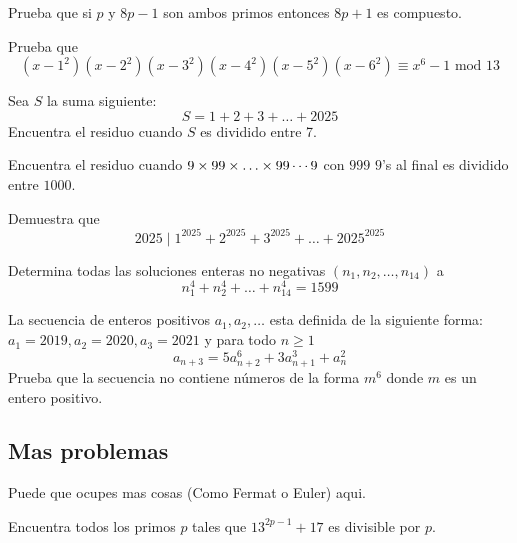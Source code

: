 \documentclass[11pt]{scrartcl}
\newcommand{\thmdifficulty}{0}
\newcommand{\problemdiff}[1]{\renewcommand{\thmdifficulty}{#1}}
\begin{document}
\problemdiff{1}
\begin{problema} 
Prueba que si $p$ y $8p-1$ son ambos primos entonces $8p+1$ es compuesto.
\end{problema}

\problemdiff{1}
 \begin{problema}
    Prueba que  
    $$(x-1^2)(x-2^2)(x-3^2)(x-4^2)(x-5^2)(x-6^2) \equiv x^6-1 \text{ mod } 13$$
\end{problema}

\problemdiff{1}
\begin{problema}
Sea $S$ la suma siguiente:
\[S=1+2+3+\ldots+2025\]
Encuentra el residuo cuando $S$ es dividido entre 7.
\end{problema}



\problemdiff{1}
\begin{problema}[AIME 2010/1]
Encuentra el residuo cuando $9 \times 99 \time 999\times \ldots \times 99\cdots9$ con $999$ $9$'s al final es dividido entre $1000$. 
\end{problema}


\problemdiff{2}
\begin{problema}
Demuestra que 
\[2025 \mid 1^{2025}+2^{2025}+3^{2025}+\ldots + 2025^{2025}\]
\end{problema}

\problemdiff{2}
\begin{problema}
Determina todas las soluciones enteras no negativas $(n_1,n_2, \ldots, n_{14})$ a
\[n_1^4+n_2^4+\ldots+n_{14}^4 =1599\]
\end{problema}

\problemdiff{2}
\begin{problema} 
[ORO 2021/3]
La secuencia de enteros positivos $a_1,a_2, \ldots$ esta definida de la siguiente forma: $a_1=2019, a_2=2020, a_3=2021$ y para todo $n\geq 1$
\[a_{n+3}=5a_{n+2}^6+3a_{n+1}^3+a_n^2\]
Prueba que la secuencia no contiene n\'umeros de la forma $m^6$ donde $m$ es un entero positivo.

\end{problema}

\newpage
\subsection{Mas problemas}
Puede que ocupes mas cosas (Como Fermat o Euler) aqui.

\problemdiff{1}
\begin{problema}
Encuentra todos los primos $p$ tales que $13^{2p-1}+17$ es divisible por $p$.
\end{problema}
\end{document}
